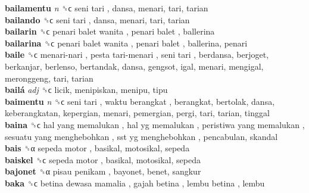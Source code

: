 \textbf{bailamentu} \emph{n}  ␝ϲ   seni tari , dansa, menari, tari, tarian  \\
\textbf{bailando} ␝ϲ   seni tari , dansa, menari, tari, tarian  \\
\textbf{bailarin} ␝ϲ   penari balet wanita ,  penari balet , ballerina  \\
\textbf{bailarina} ␝ϲ   penari balet wanita ,  penari balet , ballerina, penari  \\
\textbf{baile} ␝ϲ   menari-nari ,  pesta tari-menari ,  seni tari , berdansa, berjoget, berkanjar, berlenso, bertandak, dansa, gengsot, igal, menari, mengigal, meronggeng, tari, tarian  \\
\textbf{bailá} \emph{adj}  ␝ϲ  licik, menipiskan, menipu, tipu  \\
\textbf{baimentu} \emph{n}  ␝ϲ   seni tari ,  waktu berangkat , berangkat, bertolak, dansa, keberangkatan, kepergian, menari, pemergian, pergi, tari, tarian, tinggal  \\
\textbf{baina} ␝ϲ   hal yang memalukan ,  hal yg memalukan ,  peristiwa yang memalukan ,  sesuatu yang menghebohkan ,  sst yg menghebohkan , pencabulan, skandal  \\
\textbf{bais} ␝α   sepeda motor , basikal, motosikal, sepeda  \\
\textbf{baiskel} ␝ϲ   sepeda motor , basikal, motosikal, sepeda  \\
\textbf{bajonet} ␝α   pisau penikam , bayonet, benet, sangkur  \\
\textbf{baka} ␝ϲ   betina dewasa mamalia ,  gajah betina ,  lembu betina , lembu  \\
